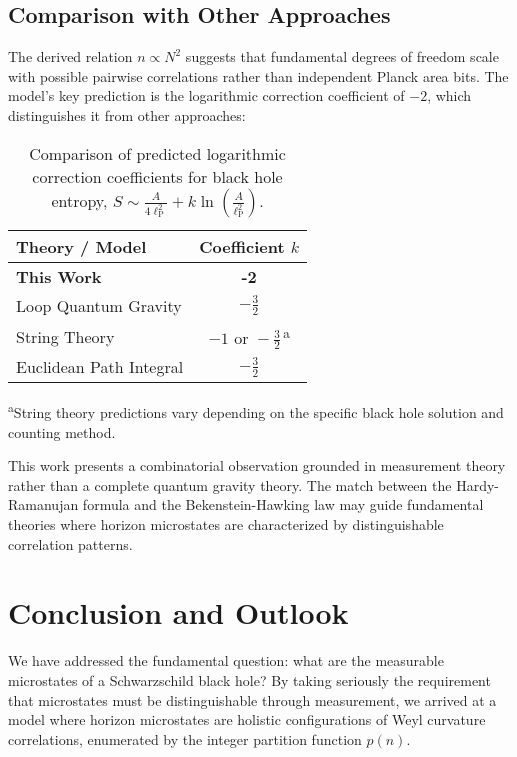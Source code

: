 \documentclass[12pt, letterpaper]{article}
\newcommand{\ellp}{\ell_{\mathrm{P}}}
\begin{document}
\subsection{Comparison with Other Approaches}

The derived relation $n \propto N^2$ suggests that fundamental degrees of freedom scale with possible pairwise correlations rather than independent Planck area bits. The model's key prediction is the logarithmic correction coefficient of $-2$, which distinguishes it from other approaches:

\begin{table}[h!]
\centering
\caption{Comparison of predicted logarithmic correction coefficients for black hole entropy, $S \sim \frac{A}{4\ellp^2} + k \ln \left( \frac{A}{\ellp^2} \right)$.}
\label{tab:comparison}
\begin{tabular}{lc}
\toprule
\textbf{Theory / Model} & \textbf{Coefficient $k$} \\
\midrule
\textbf{This Work} & \textbf{-2} \\
Loop Quantum Gravity \cite{Kaul2000} & $-\frac{3}{2}$ \\
String Theory \cite{Sen2012} & $-1 \text{ or } -\frac{3}{2}$\textsuperscript{\,a} \\
Euclidean Path Integral \cite{Gibbons1978} & $-\frac{3}{2}$ \\
\bottomrule
\end{tabular}
\smallskip
\footnotesize\textsuperscript{a}String theory predictions vary depending on the specific black hole solution and counting method.
\end{table}

This work presents a combinatorial observation grounded in measurement theory rather than a complete quantum gravity theory. The match between the Hardy-Ramanujan formula and the Bekenstein-Hawking law may guide fundamental theories where horizon microstates are characterized by distinguishable correlation patterns.

\section{Conclusion and Outlook}

We have addressed the fundamental question: what are the measurable microstates of a Schwarzschild black hole? By taking seriously the requirement that microstates must be distinguishable through measurement, we arrived at a model where horizon microstates are holistic configurations of Weyl curvature correlations, enumerated by the integer partition function $p(n)$.
\end{document}
